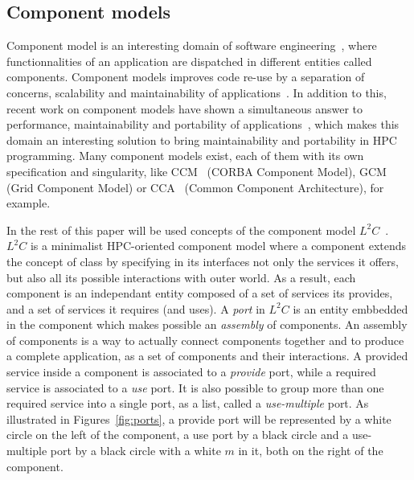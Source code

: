 \subsection{Component models}
Component model is an interesting domain of software engineering~\cite{Szyperski:2002:CSB:515228}, where functionnalities of an application are dispatched in different entities called components. Component models improves code re-use by a separation of concerns, scalability and maintainability of applications~\cite{Szyperski:2002:CSB:515228,bigot:inria-00388508}. In addition to this, recent work on component models have shown a simultaneous answer to performance, maintainability and portability of applications~\cite{l2c}, which makes this domain an interesting solution to bring maintainability and portability in HPC programming.
Many component models exist, each of them with its own specification and singularity, like CCM~\cite{corba:omg06} (CORBA Component Model), GCM~\cite{Baude} (Grid Component Model) or CCA~\cite{Armstrong:1999:TCC:822084.823232} (Common Component Architecture), for example. 

In the rest of this paper will be used concepts of the component model $L^2C$~\cite{l2c}. $L^2C$ is a minimalist HPC-oriented component model where a component extends the concept of class by specifying in its interfaces not only the services it offers, but also all its possible interactions with outer world. As a result, each component is an independant entity composed of a set of services its provides, and a set of services it requires (and uses). 
A \emph{port} in $L^2C$ is an entity embbedded in the component which makes possible an \emph{assembly} of components. An assembly of components is a way to actually connect components together and to produce a complete application, as a set of components and their interactions. A provided service inside a component is associated to a \emph{provide} port, while a required service is associated to a \emph{use} port. It is also possible to group more than one required service into a single port, as a list, called a \emph{use-multiple} port. As illustrated in Figures~\ref{fig:ports}, a provide port will be represented by a white circle on the left of the component, a use port by a black circle and a use-multiple port by a black circle with a white $m$ in it, both on the right of the component.

